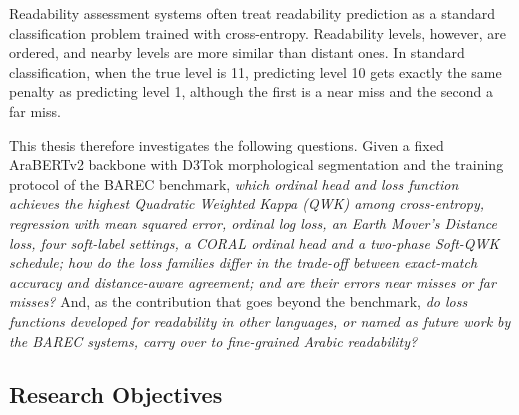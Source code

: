 Readability assessment systems often treat readability prediction as a standard classification
problem trained with cross-entropy. Readability levels, however, are ordered, and nearby levels
are more similar than distant ones. In standard classification, when the true level is 11,
predicting level 10 gets exactly the same penalty as predicting level 1, although the first is
a near miss and the second a far miss.

This thesis therefore investigates the following questions. Given a fixed AraBERTv2 backbone
with D3Tok morphological segmentation and the training protocol of the BAREC benchmark,
\emph{which ordinal head and loss function achieves the highest Quadratic Weighted Kappa (QWK)
among cross-entropy, regression with mean squared error, ordinal log loss, an Earth Mover's
Distance loss, four soft-label settings, a CORAL ordinal head and a two-phase Soft-QWK schedule;
how do the loss families differ in the trade-off between exact-match accuracy and
distance-aware agreement; and are their errors near misses or far misses?} And, as the
contribution that goes beyond the benchmark, \emph{do loss functions developed for readability
in other languages, or named as future work by the BAREC systems, carry over to fine-grained
Arabic readability?}

\subsection{Research Objectives}

